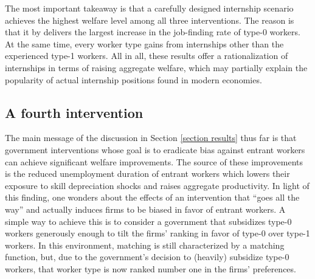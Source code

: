\documentclass[12pt]{article} %
\theoremstyle{definition}
\begin{document}
The most important takeaway is that a carefully designed internship scenario achieves the highest welfare level among all three interventions.
The reason is that it by delivers the largest increase in the job-finding rate of type-0 workers.
At the same time, every worker type gains from internships other than the experienced type-1 workers.
All in all, these results offer a rationalization of internships in terms of raising aggregate welfare, which may partially explain the popularity of actual internship positions found in modern economies.

\subsection{A fourth intervention} \label{section fourth intervention}

The main message of the discussion in Section \ref{section results} thus far is that government interventions whose goal is to eradicate bias against entrant workers can achieve significant welfare improvements.
The source of these improvements is the reduced unemployment duration of entrant workers which lowers their exposure to skill depreciation shocks and raises aggregate productivity.
In light of this finding, one wonders about the effects of an intervention that ``goes all the way'' and actually induces firms to be biased in favor of entrant workers.
A simple way to achieve this is to consider a government that subsidizes type-0 workers generously enough to tilt the firms' ranking in favor of type-0 over type-1 workers. 
In this environment, matching is still characterized by a \cite{petrongolo2001looking} matching function, but, due to the government's decision to (heavily) subsidize type-0 workers, that worker type is now ranked number one in the firms' preferences. 
\end{document}
